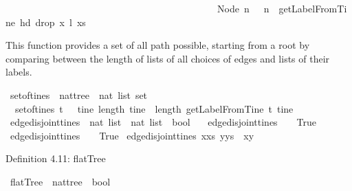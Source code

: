 \begin{isabellebody}
\ \ \ \ \ \ \ \ \ \ \ \ \ \ \ \ \ \ \ \ \ \ \ \ \ \ \ \ \ \ \ \ \ \ \ \ \ \ \ \ \ \ \ \ Node\ n\ {\isacharunderscore}\ {\isasymRightarrow}\ n\ {\isacharhash}\ getLabelFromTine\ {\isacharparenleft}hd\ {\isacharparenleft}drop\ x\ l{\isacharparenright}{\isacharparenright}\ xs{\isacharparenright}{\isacharparenright}{\isachardoublequoteclose}%
\begin{isamarkuptext}%
This function provides a set of all path possible, starting from a root by comparing between
the length of lists of all choices of edges and lists of their labels.%
\end{isamarkuptext}\isamarkuptrue%
\isamarkupfalse%
\ set{\isacharunderscore}of{\isacharunderscore}tines\ {\isacharcolon}{\isacharcolon}\ {\isachardoublequoteopen}nattree\ {\isasymRightarrow}\ {\isacharparenleft}nat\ list{\isacharparenright}\ set{\isachardoublequoteclose}\ \isanewline
\ \ {\isachardoublequoteopen}set{\isacharunderscore}of{\isacharunderscore}tines\ t\ \ {\isacharequal}\ {\isacharbraceleft}tine{\isachardot}\ length\ tine\ {\isacharequal}\ length\ {\isacharparenleft}getLabelFromTine\ t\ tine{\isacharparenright}{\isacharbraceright}{\isachardoublequoteclose}\ \ \isanewline
\isanewline
{}\isamarkupfalse%
\ edge{\isacharunderscore}disjoint{\isacharunderscore}tines\ {\isacharcolon}{\isacharcolon}\ {\isachardoublequoteopen}nat\ list\ {\isasymRightarrow}\ nat\ list\ {\isasymRightarrow}\ bool{\isachardoublequoteclose}\ \isanewline
\ \ {\isachardoublequoteopen}edge{\isacharunderscore}disjoint{\isacharunderscore}tines\ {\isacharbrackleft}{\isacharbrackright}\ {\isacharunderscore}\ {\isacharequal}\ True{\isachardoublequoteclose}\ \isanewline
{\isacharbar}\ {\isachardoublequoteopen}edge{\isacharunderscore}disjoint{\isacharunderscore}tines\ {\isacharunderscore}\ {\isacharbrackleft}{\isacharbrackright}\ {\isacharequal}\ True{\isachardoublequoteclose}\isanewline
{\isacharbar}\ {\isachardoublequoteopen}edge{\isacharunderscore}disjoint{\isacharunderscore}tines\ {\isacharparenleft}x{\isacharhash}xs{\isacharparenright}\ {\isacharparenleft}y{\isacharhash}ys{\isacharparenright}\ {\isacharequal}\ {\isacharparenleft}x{\isasymnoteq}y{\isacharparenright}{\isachardoublequoteclose}%
\begin{isamarkuptext}%
Definition 4.11: flatTree%
\end{isamarkuptext}\isamarkuptrue%
\isamarkupfalse%
\ flatTree\ {\isacharcolon}{\isacharcolon}\ {\isachardoublequoteopen}nattree\ {\isasymRightarrow}\ bool{\isachardoublequoteclose}\ \isanewline

\end{isabellebody}
